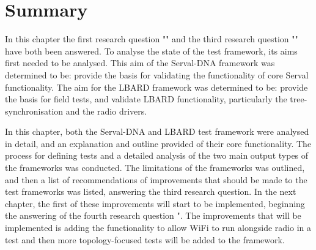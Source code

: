 \section{Summary}
In this chapter the first research question "\firstRQ" and the third research question "\thirdRQ" have both been answered.
To analyse the state of the test framework, its aims first needed to be analysed. 
This aim of the Serval-DNA framework was determined to be: provide the basis for validating the functionality of core Serval functionality.
The aim for the LBARD framework was determined to be: provide the basis for field tests, and validate LBARD functionality, particularly the tree-synchronisation and the radio drivers.

In this chapter, both the Serval-DNA and LBARD test framework were analysed in detail, and an explanation and outline provided of their core functionality.
The process for defining tests and a detailed analysis of the two main output types of the frameworks was conducted.
The limitations of the frameworks was outlined, and then a list of recommendations of improvements that should be made to the test frameworks was listed, answering the third research question.
In the next chapter, the first of these improvements will start to be implemented, beginning the answering of the fourth research question "\fourthRQ.
The improvements that will be implemented is adding the functionality to allow WiFi to run alongside radio in a test and then more topology-focused tests will be added to the framework.
